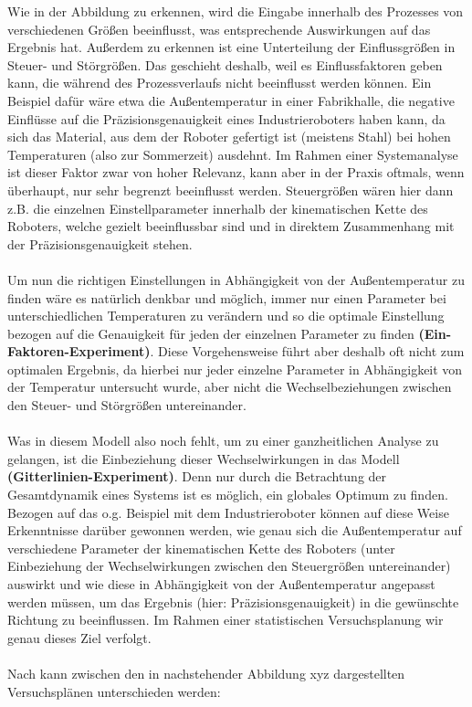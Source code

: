 \documentclass[
fontsize=10pt, 
listof = totoc,
parskip = half	
]{report}
\begin{document}
\noindent Wie in der Abbildung zu erkennen, wird die Eingabe innerhalb des Prozesses von verschiedenen Größen beeinflusst, was entsprechende Auswirkungen auf das Ergebnis hat. Außerdem zu erkennen ist eine Unterteilung der Einflussgrößen in Steuer- und Störgrößen. Das geschieht deshalb, weil es Einflussfaktoren geben kann, die während des Prozessverlaufs nicht beeinflusst werden können. Ein Beispiel dafür wäre etwa die Außentemperatur in einer Fabrikhalle, die negative Einflüsse auf die Präzisionsgenauigkeit eines Industrieroboters haben kann, da sich das Material, aus dem der Roboter gefertigt ist (meistens Stahl) bei hohen Temperaturen (also zur Sommerzeit) ausdehnt. Im Rahmen einer Systemanalyse ist dieser Faktor zwar von hoher Relevanz, kann aber in der Praxis oftmals, wenn überhaupt, nur sehr begrenzt beeinflusst werden. Steuergrößen wären hier dann z.B. die einzelnen Einstellparameter innerhalb der kinematischen Kette des Roboters, welche gezielt beeinflussbar sind und in direktem Zusammenhang mit der Präzisionsgenauigkeit stehen.
\\\\
Um nun die richtigen Einstellungen in Abhängigkeit von der Außentemperatur zu finden wäre es natürlich denkbar und möglich, immer nur einen Parameter bei unterschiedlichen Temperaturen zu verändern und so die optimale Einstellung bezogen auf die Genauigkeit für jeden der einzelnen Parameter zu finden \textbf{(Ein-Faktoren-Experiment)}. Diese Vorgehensweise führt aber deshalb oft nicht zum optimalen Ergebnis, da hierbei nur jeder einzelne Parameter in Abhängigkeit von der Temperatur untersucht wurde, aber nicht die Wechselbeziehungen zwischen den Steuer- und Störgrößen untereinander.
\\\\
\noindent Was in diesem Modell also noch fehlt, um zu einer ganzheitlichen Analyse zu gelangen, ist die Einbeziehung dieser Wechselwirkungen  in das Modell \textbf{(Gitterlinien-Experiment)}. Denn nur durch die Betrachtung der Gesamtdynamik eines Systems ist es möglich, ein globales Optimum zu finden. Bezogen auf das o.g. Beispiel mit dem Industrieroboter können auf diese Weise Erkenntnisse darüber gewonnen werden, wie genau sich die Außentemperatur auf verschiedene Parameter der kinematischen Kette des Roboters (unter Einbeziehung der Wechselwirkungen zwischen den Steuergrößen untereinander) auswirkt und wie diese in Abhängigkeit von der Außentemperatur angepasst werden müssen, um das Ergebnis (hier: Präzisionsgenauigkeit) in die gewünschte Richtung zu beeinflussen. Im Rahmen einer statistischen Versuchsplanung wir genau dieses Ziel verfolgt.
\\\\
Nach \cite{schiefer_2018} kann zwischen den in nachstehender Abbildung xyz dargestellten Versuchsplänen unterschieden werden:
\end{document}
